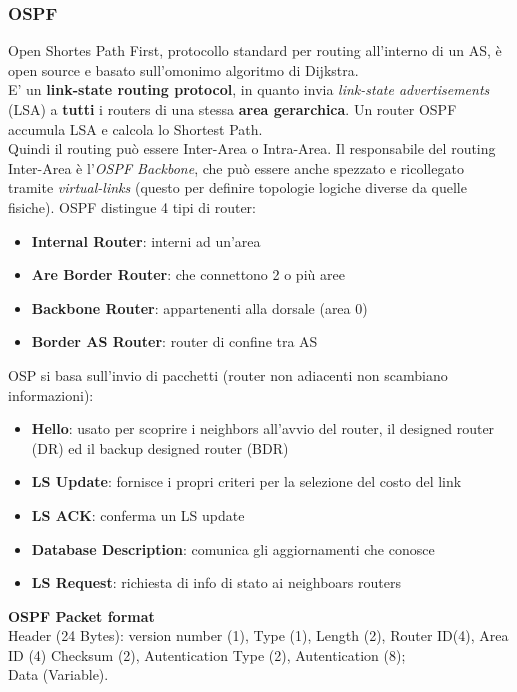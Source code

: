 \documentclass[a4paper,11pt]{article}
\begin{document}
\subsubsection{OSPF}
Open Shortes Path First, protocollo standard per routing all'interno di un AS, è open source e basato sull'omonimo algoritmo di Dijkstra.\\
E' un \textbf{link-state routing protocol}, in quanto invia \textit{link-state advertisements} (LSA) a \textbf{tutti} i routers di una stessa \textbf{area gerarchica}. Un router OSPF accumula LSA e calcola lo Shortest Path.\\
Quindi il routing può essere Inter-Area o Intra-Area. Il responsabile del routing Inter-Area è l'\textit{OSPF Backbone}, che può essere anche spezzato e ricollegato tramite \textit{virtual-links} (questo per definire topologie logiche diverse da quelle fisiche).
OSPF distingue 4 tipi di router:
\begin{itemize}
\item\textbf{Internal Router}: interni ad un'area
\item\textbf{Are Border Router}: che connettono 2 o più aree
\item\textbf{Backbone Router}: appartenenti alla dorsale (area 0)
\item\textbf{Border AS Router}: router di confine tra AS
\end{itemize}
OSP si basa sull'invio di pacchetti (router non adiacenti non scambiano informazioni):
\begin{itemize}
\item\textbf{Hello}: usato per scoprire i neighbors all'avvio del router, il designed router (DR) ed il backup designed router (BDR)
\item\textbf{LS Update}: fornisce i propri criteri per la selezione del costo del link
\item\textbf{LS ACK}: conferma un LS update
\item\textbf{Database Description}: comunica gli aggiornamenti che conosce
\item\textbf{LS Request}: richiesta di info di stato ai neighboars routers
\end{itemize}
\textbf{OSPF Packet format}\\Header (24 Bytes): version number (1), Type (1), Length (2), Router ID(4), Area ID (4) Checksum (2), Autentication Type (2), Autentication (8); \\Data (Variable).
                                                                                                                     \newpage
\end{document}
